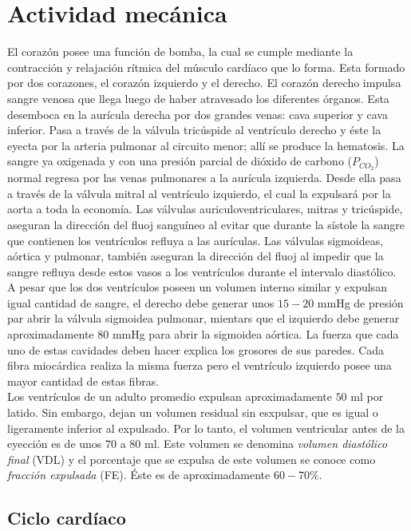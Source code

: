 \section{Actividad mecánica}

El corazón posee una función de bomba, la cual se cumple mediante la contracción y relajación rítmica del músculo cardíaco que lo forma. Esta formado por dos corazones, el corazón izquierdo y el derecho. El corazón derecho impulsa sangre venosa que llega luego de haber atravesado los diferentes órganos. Esta desemboca en la aurícula derecha por dos grandes venas: cava superior y cava inferior. Pasa a través de la válvula tricúspide al ventrículo derecho y éste la eyecta por la arteria pulmonar al circuito menor; allí se produce la hematosis. La sangre ya oxigenada y con una presión parcial de dióxido de carbono ($P_{CO_2}$) normal regresa por las venas pulmonares a la aurícula izquierda. Desde ella pasa a través de la válvula mitral al ventrículo izquierdo, el cual la expulsará por la aorta a toda la economía. Las válvulas auriculoventriculares, mitras y tricúspide, aseguran la dirección del fluoj sanguíneo al evitar que durante la sístole la sangre que contienen los ventrículos refluya a las aurículas. Las válvulas sigmoideas, aórtica y pulmonar, también aseguran la dirección del fluoj al impedir que la sangre refluya desde estos vasos a los ventrículos durante el intervalo diastólico. \\
\indent A pesar que los dos ventrículos poseen un volumen interno similar y expulsan igual cantidad de sangre, el derecho debe generar unos $15-20$ mmHg de presión par abrir la válvula sigmoidea pulmonar, mientars que el izquierdo debe generar aproximadamente $80$ mmHg para abrir la sigmoidea aórtica. La fuerza que cada uno de estas cavidades deben hacer explica los grosores de sus paredes. Cada fibra miocárdica realiza la misma fuerza pero el ventrículo izquierdo posee una mayor cantidad de estas fibras. \\
\indent Los ventrículos de un adulto promedio expulsan aproximadamente $50$ ml por latido. Sin embargo, dejan un volumen residual sin esxpulsar, que es igual o ligeramente inferior al expulsado. Por lo tanto, el volumen ventricular antes de la eyección es de unos $70$ a $80$ ml. Este volumen se denomina \textit{volumen diastólico final} (VDL) y el porcentaje que se expulsa de este volumen se conoce como \textit{fracción expulsada} (FE). Éste es de aproximadamente $60-70\%$.

\subsection*{Ciclo cardíaco}

